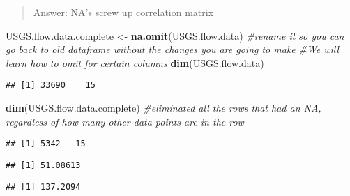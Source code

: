 \documentclass[]{article}
\newenvironment{Shaded}{\begin{snugshade}}{\end{snugshade}}
\newcommand{\CommentTok}[1]{\textcolor[rgb]{0.56,0.35,0.01}{\textit{#1}}}
\newcommand{\KeywordTok}[1]{\textcolor[rgb]{0.13,0.29,0.53}{\textbf{#1}}}
\newcommand{\NormalTok}[1]{#1}
\newcommand{\OperatorTok}[1]{\textcolor[rgb]{0.81,0.36,0.00}{\textbf{#1}}}
\newcommand{\StringTok}[1]{\textcolor[rgb]{0.31,0.60,0.02}{#1}}
\begin{document}
\begin{quote}
Answer: NA's screw up correlation matrix
\end{quote}

\begin{Shaded}
\begin{Highlighting}[]
\NormalTok{USGS.flow.data.complete <-}\StringTok{ }\KeywordTok{na.omit}\NormalTok{(USGS.flow.data) }\CommentTok{#rename it so you can go back to old dataframe without the changes you are going to make}
\CommentTok{#We will learn how to omit for certain columns}
\KeywordTok{dim}\NormalTok{(USGS.flow.data)}
\end{Highlighting}
\end{Shaded}

\begin{verbatim}
## [1] 33690    15
\end{verbatim}

\begin{Shaded}
\begin{Highlighting}[]
\KeywordTok{dim}\NormalTok{(USGS.flow.data.complete) }\CommentTok{#eliminated all the rows that had an NA, regardless of how many other data points are in the row}
\end{Highlighting}
\end{Shaded}

\begin{verbatim}
## [1] 5342   15
\end{verbatim}

\begin{Shaded}
\end{Shaded}

\begin{verbatim}
## [1] 51.08613
\end{verbatim}

\begin{Shaded}
\end{Shaded}

\begin{verbatim}
## [1] 137.2094
\end{verbatim}
\end{document}
